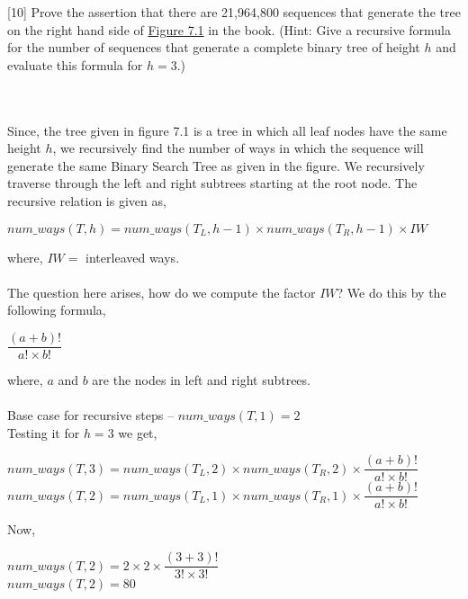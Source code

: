 \documentclass[addpoints]{exam}
\begin{document}
\begin{questions}
  [10]
  Prove the assertion that there are 21,964,800 sequences that generate the tree on the right hand side of \href{http://opendatastructures.org/ods-python/7_1_Random_Binary_Search_Tr.html#fig:rbs-lvc}{Figure 7.1} in the book. (Hint: Give a recursive formula for the number of sequences that generate a complete binary tree of height $h$ and evaluate this formula for $h = 3$.)
  \begin{solution}\\ \\
  	Since, the tree given in figure 7.1 is a tree in which all leaf nodes have the same height $h$, we recursively find the number of ways in which the sequence will generate the same Binary Search Tree as given in the figure. We recursively traverse through the left and right subtrees starting at the root node. The recursive relation is given as, \\ 
  	\begin{center}
  		$num\_ways(T, h) = num\_ways(T_L, h-1) \times num\_ways(T_R, h-1) \times IW$
  	\end{center}
  	where, $IW = $ interleaved ways.\\ \\
  	The question here arises, how do we compute the factor $IW$? We do this by the following formula,\\
  	\begin{center}
  		$\dfrac{(a+b)!}{a! \times b!}$
  	\end{center}
  	where, $a$ and $b$ are the nodes in left and right subtrees. \\ \\
  	Base case for recursive steps -- $num\_ways(T, 1)=2$\\ 
  	Testing it for $h=3$ we get, \\
  	\begin{center}
  		$num\_ways(T, 3) = num\_ways(T_L, 2) \times num\_ways(T_R, 2) \times \dfrac{(a+b)!}{a! \times b!}$\\
  		$num\_ways(T, 2) = num\_ways(T_L, 1) \times num\_ways(T_R, 1) \times \dfrac{(a+b)!}{a! \times b!}$\\
  	\end{center}
  	Now,\\
  	\begin{center}
  		$num\_ways(T, 2) = 2 \times 2 \times \dfrac{(3+3)!}{3! \times 3!}$\\
  		$num\_ways(T, 2) = 80$\\
  	\end{center}

\end{solution}
\end{questions}
\end{document}
